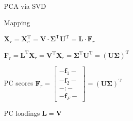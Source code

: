 \documentclass[mathserif, aspectratio=1610]{intbeamer}
\begin{document}
\begin{frame}[t]{PCA via SVD}
\begin{minipage}[t]{0.49\textwidth}
Mapping

$\bm{X}_r = \bm{X}_c^\mathrm{T} = \bm{V} \cdot \bm{\Sigma}^\mathrm{T} \bm{U}^\mathrm{T} = \bm{L} \cdot \bm{F}_r$

$\bm{F}_r = \bm{L}^\mathrm{T} \bm{X}_r = \bm{V}^\mathrm{T} \bm{X}_r = \bm{\Sigma}^\mathrm{T} \bm{U}^\mathrm{T} = ( \bm{U} \bm{\Sigma})^\mathrm{T}$

PC scores $\bm{F}_r =
\begin{bmatrix}
- \bm{f}_1 -\\
- \bm{f}_2 -\\
- : -\\
- \bm{f}_F -
\end{bmatrix}
=
(\bm{U} \bm{\Sigma})^\mathrm{T}$

PC loadings $\bm{L} = \bm{V} $



\end{minipage}

\end{frame}
\end{document}
